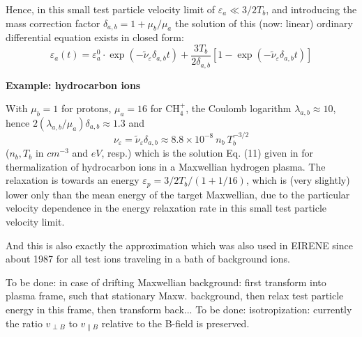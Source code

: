 Hence, in this small test particle velocity limit of $\varepsilon_a \ll 3/2T_b$,
and introducing the mass correction factor $\delta_{a,b}=1+\mu_b/\mu_a$ the solution of this (now: linear) ordinary differential
equation exists in closed form:
\begin{equation}\label{eq.solut1}
\varepsilon_a(t)=\varepsilon_a^0 \cdot
\exp(-\tilde{\nu}_\varepsilon\delta_{a,b}  t)+
\frac{3T_b}{2\delta_{a,b}}\left[1-\exp(-\tilde{\nu}_\varepsilon \delta_{a,b}t)\right]
\end{equation}

\textbf{Example: hydrocarbon ions \cite{kn:Langer}}

With $\mu_b=1$ for protons, $\mu_a=16$ for CH$_4^+$, the Coulomb logarithm $\lambda_{a,b}\approx 10$,
hence $2 (\lambda_{a,b}/\mu_a) \delta_{a,b} \approx 1.3$ and
\begin{equation}
{\nu}_\varepsilon = \tilde{\nu}_\varepsilon \delta_{a,b}\approx
8.8 \times 10^{-8}~ n_b~T_b^{-3/2}
\nonumber
\end{equation}
($n_b, T_b$ in $cm^{-3}$ and $eV$, resp.)
which is the solution Eq. (11) given in \cite{kn:Langer} for thermalization
of hydrocarbon ions in a Maxwellian hydrogen plasma. The relaxation is towards an energy
$\varepsilon_p = 3/2 T_b/(1+1/16)$, which is (very slightly) lower only than the mean energy of the target Maxwellian, due to
the particular velocity dependence in the energy relaxation rate in this small test particle velocity limit.

And this is also exactly the approximation which was also used in EIRENE
since about 1987 for all test ions traveling in a bath of background ions.

\textcolor[rgb]{1.00,0.00,0.00}{To be done: in case of drifting Maxwellian background: first transform into plasma frame, such that stationary Maxw. background,
then relax test particle energy in this frame, then transform back...
To be done: isotropization: currently the ratio $v_{\perp B}$ to $v_{\parallel B}$ relative to the B-field  is preserved.}

